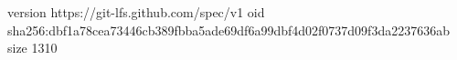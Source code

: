version https://git-lfs.github.com/spec/v1
oid sha256:dbf1a78cea73446cb389fbba5ade69df6a99dbf4d02f0737d09f3da2237636ab
size 1310
